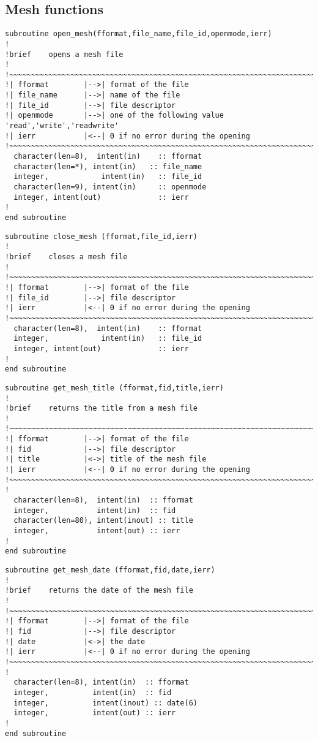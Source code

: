 \subsection{Mesh functions}
\begin{lstlisting}
subroutine open_mesh(fformat,file_name,file_id,openmode,ierr)
!
!brief    opens a mesh file
!
!~~~~~~~~~~~~~~~~~~~~~~~~~~~~~~~~~~~~~~~~~~~~~~~~~~~~~~~~~~~~~~~~~~~~~~~
!| fformat        |-->| format of the file
!| file_name      |-->| name of the file
!| file_id        |-->| file descriptor
!| openmode       |-->| one of the following value 'read','write','readwrite'
!| ierr           |<--| 0 if no error during the opening
!~~~~~~~~~~~~~~~~~~~~~~~~~~~~~~~~~~~~~~~~~~~~~~~~~~~~~~~~~~~~~~~~~~~~~~~
  character(len=8),  intent(in)    :: fformat
  character(len=*), intent(in)   :: file_name
  integer,            intent(in)   :: file_id
  character(len=9), intent(in)     :: openmode
  integer, intent(out)             :: ierr
!
end subroutine
\end{lstlisting}
%
\begin{lstlisting}
subroutine close_mesh (fformat,file_id,ierr)
!
!brief    closes a mesh file
!
!~~~~~~~~~~~~~~~~~~~~~~~~~~~~~~~~~~~~~~~~~~~~~~~~~~~~~~~~~~~~~~~~~~~~~~~
!| fformat        |-->| format of the file
!| file_id        |-->| file descriptor
!| ierr           |<--| 0 if no error during the opening
!~~~~~~~~~~~~~~~~~~~~~~~~~~~~~~~~~~~~~~~~~~~~~~~~~~~~~~~~~~~~~~~~~~~~~~~
  character(len=8),  intent(in)    :: fformat
  integer,            intent(in)   :: file_id
  integer, intent(out)             :: ierr
!
end subroutine
\end{lstlisting}
%
\begin{lstlisting}
subroutine get_mesh_title (fformat,fid,title,ierr)
!
!brief    returns the title from a mesh file
!
!~~~~~~~~~~~~~~~~~~~~~~~~~~~~~~~~~~~~~~~~~~~~~~~~~~~~~~~~~~~~~~~~~~~~~~~
!| fformat        |-->| format of the file
!| fid            |-->| file descriptor
!| title          |<->| title of the mesh file
!| ierr           |<--| 0 if no error during the opening
!~~~~~~~~~~~~~~~~~~~~~~~~~~~~~~~~~~~~~~~~~~~~~~~~~~~~~~~~~~~~~~~~~~~~~~~
!
  character(len=8),  intent(in)  :: fformat
  integer,           intent(in)  :: fid
  character(len=80), intent(inout) :: title
  integer,           intent(out) :: ierr
!
end subroutine
\end{lstlisting}
%
\begin{lstlisting}
subroutine get_mesh_date (fformat,fid,date,ierr)
!
!brief    returns the date of the mesh file
!
!~~~~~~~~~~~~~~~~~~~~~~~~~~~~~~~~~~~~~~~~~~~~~~~~~~~~~~~~~~~~~~~~~~~~~~~
!| fformat        |-->| format of the file
!| fid            |-->| file descriptor
!| date           |<->| the date
!| ierr           |<--| 0 if no error during the opening
!~~~~~~~~~~~~~~~~~~~~~~~~~~~~~~~~~~~~~~~~~~~~~~~~~~~~~~~~~~~~~~~~~~~~~~~
!
  character(len=8), intent(in)  :: fformat
  integer,          intent(in)  :: fid
  integer,          intent(inout) :: date(6)
  integer,          intent(out) :: ierr
!
end subroutine
\end{lstlisting}
